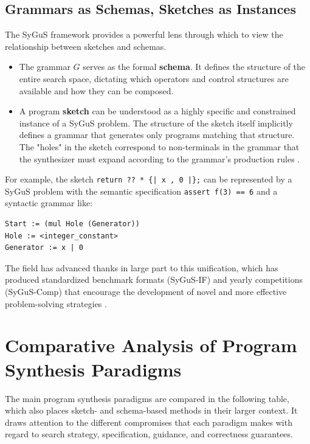 \documentclass[12pt, a4paper]{report}
\begin{document}
\subsection{Grammars as Schemas, Sketches as Instances}
The SyGuS framework provides a powerful lens through which to view the relationship between sketches and schemas.
\begin{itemize}
    \item The grammar $G$ serves as the formal \textbf{schema}. It defines the structure of the entire search space, dictating which operators and control structures are available and how they can be composed.
    \item A program \textbf{sketch} can be understood as a highly specific and constrained instance of a SyGuS problem. The structure of the sketch itself implicitly defines a grammar that generates only programs matching that structure. The "holes" in the sketch correspond to non-terminals in the grammar that the synthesizer must expand according to the grammar's production rules \citep{alur2013syntax}.
\end{itemize}
For example, the sketch \texttt{return ?? * \{| x , 0 |\};} can be represented by a SyGuS problem with the semantic specification \texttt{assert f(3) == 6} and a syntactic grammar like:
\begin{verbatim}
Start := (mul Hole (Generator))
Hole := <integer_constant>
Generator := x | 0
\end{verbatim}
The field has advanced thanks in large part to this unification, which has produced standardized benchmark formats (SyGuS-IF) and yearly competitions (SyGuS-Comp) that encourage the development of novel and more effective problem-solving strategies \citep{alur2013syntax}.

\section{Comparative Analysis of Program Synthesis Paradigms}
The main program synthesis paradigms are compared in the following table, which also places sketch- and schema-based methods in their larger context. It draws attention to the different compromises that each paradigm makes with regard to search strategy, specification, guidance, and correctness guarantees.
\end{document}
